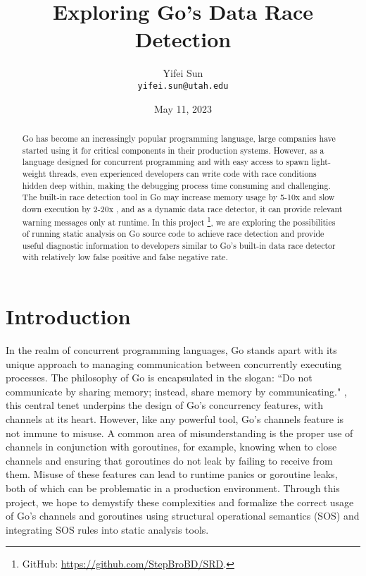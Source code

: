 \documentclass[12pt]{article}
\title{Exploring Go's Data Race Detection}
\author{Yifei Sun\orcidlink{0000-0002-1591-7458}\\\texttt{yifei.sun@utah.edu}}
\date{May 11, 2023}
\begin{document}
\maketitle

\begin{abstract}
Go has become an increasingly popular programming language, large companies have started using it for critical components in their production systems. However, as a language designed for concurrent programming and with easy access to spawn light-weight threads, even experienced developers can write code with race conditions hidden deep within, making the debugging process time consuming and challenging. The built-in race detection tool in Go may increase memory usage by 5-10x and slow down execution by 2-20x \cite{godev-golang-runtime-race-detector}, and as a dynamic data race detector, it can provide relevant warning messages only at runtime. In this project \footnote{GitHub: \url{https://github.com/StepBroBD/SRD}.}, we are exploring the possibilities of running static analysis on Go source code to achieve race detection and provide useful diagnostic information to developers similar to Go's built-in data race detector with relatively low false positive and false negative rate.
\end{abstract}

\section{Introduction}

In the realm of concurrent programming languages, Go stands apart with its unique approach to managing communication between concurrently executing processes. The philosophy of Go is encapsulated in the slogan: ``Do not communicate by sharing memory; instead, share memory by communicating." \cite{godev-effective-go}, this central tenet underpins the design of Go's concurrency features, with channels at its heart. However, like any powerful tool, Go's channels feature is not immune to misuse. A common area of misunderstanding is the proper use of channels in conjunction with goroutines, for example, knowing when to close channels and ensuring that goroutines do not leak by failing to receive from them. Misuse of these features can lead to runtime panics or goroutine leaks, both of which can be problematic in a production environment. Through this project, we hope to demystify these complexities and formalize the correct usage of Go's channels and goroutines using structural operational semantics (SOS) and integrating SOS rules into static analysis tools.
\end{document}
